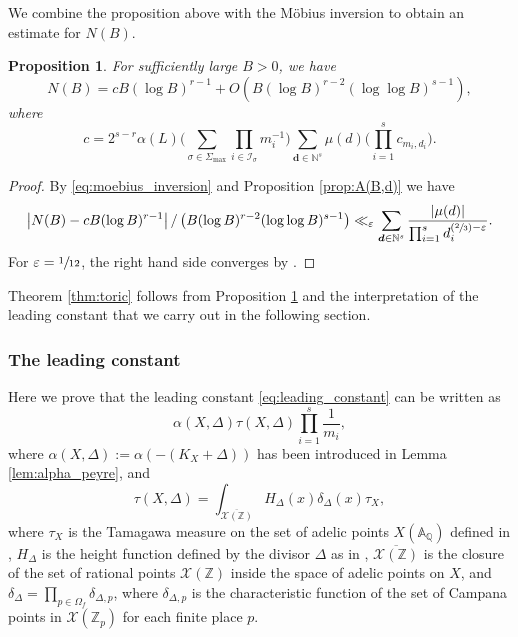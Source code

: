 \documentclass[JEP,XML,SOM,Unicode,published]{cedram}
\newcommand{\Psfrac}[2]{(\sfrac{#1}{#2})}
\newcommand{\bfd}{\boldsymbol{d}}
\newcommand\ZZ{\mathbb{Z}}
\newcommand\NN{\mathbb{N}}
\newcommand\QQ{\mathbb{Q}}
\newcommand{\ic}[1]{\mathcal{I}_{#1}}
\newtheorem{prop}[theorem]{Proposition}
\theoremstyle{definition}
\numberwithin{theorem}{section}
\begin{document}
We combine the proposition above with the Möbius inversion to obtain an estimate for $N(B)$.

\begin{prop}
\label{prop:final_estimate}
For sufficiently large $B>0$, we have
\[
N(B) = c B(\log B)^{r-1} + O(
B(\log B)^{r-2}(\log\log B)^{s-1}),
\]
where
\begin{equation}
\label{eq:leading_constant}
c=2^{s-r}\alpha(L)\biggl(\sum_{\sigma\in\Sigma_{\max}}\prod_{i\in\ic{\sigma}}m_i^{-1}\biggr)
\sum_{\bfd\in\NN^{s}}\mu(d)
\biggl(\prod_{i=1}^sc_{m_i,d_i}\biggr).
\end{equation}
\end{prop}
\begin{proof}
By \eqref{eq:moebius_inversion} and Proposition \ref{prop:A(B,d)}
we have
\[
\left|
N(B)-
c B(\log B)^{r-1}
\right|
/ \left(B(\log B)^{r-2}(\log\log B)^{s-1} \right) \ll_{\varepsilon}
\sum_{\bfd\in\NN^{s}}\frac{|\mu(d)|}
{\prod_{i=1}^s d_i^{\Psfrac23-\varepsilon}}.
\]
For $\varepsilon=\sfrac1{12}$, the right hand side converges by \cite[Lem.\,11.15]{MR1679841}.
\end{proof}

Theorem \ref{thm:toric} follows from Proposition \ref{prop:final_estimate}
and the interpretation of the leading constant that we carry out in the following section.

\subsubsection{The leading constant}

Here we prove that the leading constant \eqref{eq:leading_constant} can be written as\vspace*{-3pt}
\begin{equation}
\label{eq:expected_leading_constant}
\alpha(X, \Delta)\tau(X,\Delta)\prod_{i=1}^s\frac 1{m_i},
\end{equation}
where $\alpha(X,\Delta):=\alpha(-(K_X+\Delta))$ has been introduced in
Lemma \ref{lem:alpha_peyre}, and\vspace*{-3pt}
\[
\tau(X,\Delta)=\int_{\overline {\mathscr X(\ZZ)}}H_{\Delta}(x) \delta_{\Delta}(x) \tau_X,
\]
where $\tau_X$ is the Tamagawa measure on the set of adelic points $X(\mathbb A_\QQ)$
defined in \cite[Def.\,2.8]{MR2740045},
$H_\Delta$ is the height function defined by the divisor $\Delta$ as in \cite[\S2.1]{MR1369408},
$\overline {\mathscr X(\ZZ)}$ is the closure of the set of rational points $\mathscr X(\ZZ)$
inside the space of adelic points on $X$,
and $\delta_{\Delta}=\prod_{p\in\Omega_f}\delta_{\Delta, p}$,
where $\delta_{\Delta,p}$ is the characteristic function of the set of
Campana points in $\mathscr{X}(\ZZ_p)$ for each finite place $p$.
\end{document}
